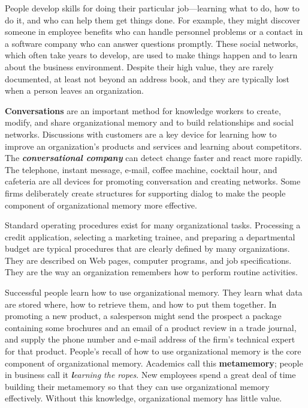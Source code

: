 \documentclass[
]{article}
\begin{document}
People develop skills for doing their particular job---learning what to
do, how to do it, and who can help them get things done. For example,
they might discover someone in employee benefits who can handle
personnel problems or a contact in a software company who can answer
questions promptly. These social networks, which often take years to
develop, are used to make things happen and to learn about the business
environment. Despite their high value, they are rarely documented, at
least not beyond an address book, and they are typically lost when a
person leaves an organization.

\textbf{Conversations} are an important method for knowledge workers to
create, modify, and share organizational memory and to build
relationships and social networks. Discussions with customers are a key
device for learning how to improve an organization's products and
services and learning about competitors. The \textbf{\emph{conversational
company}} can detect change faster and react more rapidly. The
telephone, instant message, e-mail, coffee machine, cocktail hour, and
cafeteria are all devices for promoting conversation and creating
networks. Some firms deliberately create structures for supporting
dialog to make the people component of organizational memory more
effective.

Standard operating procedures exist for many organizational tasks.
Processing a credit application, selecting a marketing trainee, and
preparing a departmental budget are typical procedures that are clearly
defined by many organizations. They are described on Web pages, computer
programs, and job specifications. They are the way an organization
remembers how to perform routine activities.

Successful people learn how to use organizational memory. They learn
what data are stored where, how to retrieve them, and how to put them
together. In promoting a new product, a salesperson might send the
prospect a package containing some brochures and an email of a product
review in a trade journal, and supply the phone number and e-mail
address of the firm's technical expert for that product. People's recall
of how to use organizational memory is the core component of
organizational memory. Academics call this \textbf{metamemory}; people in
business call it \emph{\textbf{l}earning the ropes}. New employees spend a great
deal of time building their metamemory so that they can use
organizational memory effectively. Without this knowledge,
organizational memory has little value.
\end{document}
